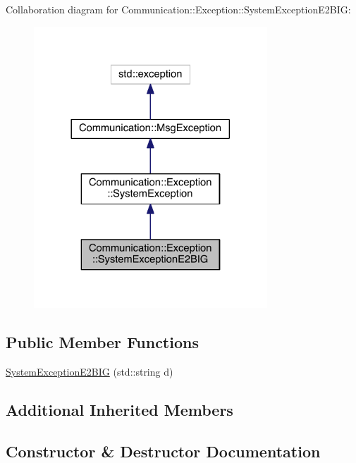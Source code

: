 Collaboration diagram for Communication\+:\+:Exception\+:\+:System\+Exception\+E2\+B\+I\+G\+:\nopagebreak
\begin{figure}[H]
\begin{center}
\leavevmode
\includegraphics[width=248pt]{class_communication_1_1_exception_1_1_system_exception_e2_b_i_g__coll__graph}
\end{center}
\end{figure}
\subsection*{Public Member Functions}
\begin{DoxyCompactItemize}
\item 
\hyperlink{class_communication_1_1_exception_1_1_system_exception_e2_b_i_g_a88648136edaa97db6d8e497d3e363906}{System\+Exception\+E2\+B\+I\+G} (std\+::string d)
\end{DoxyCompactItemize}
\subsection*{Additional Inherited Members}


\subsection{Constructor \& Destructor Documentation}
\hypertarget{class_communication_1_1_exception_1_1_system_exception_e2_b_i_g_a88648136edaa97db6d8e497d3e363906}{}
